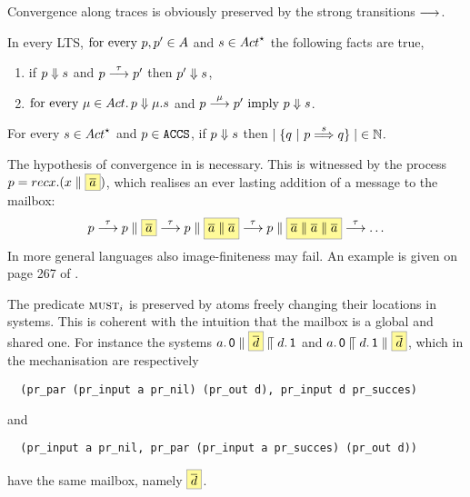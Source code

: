 Convergence along traces is obviously preserved by the strong transitions $\mathrel{\overset{}\longrightarrow}$.

\begin{lemma}%
  \label{lem:acnv-aux}
  In every LTS,
  $\text{for every } p, p' \in A$ and $ \trace \in \Actfin$
  the following facts are true,
  \begin{enumerate}
    \item
       if $p \mathrel{\Downarrow} s$
      and $p \mathrel{\overset{\tau}\longrightarrow} p'$ then $p' \mathrel{\Downarrow} s$,\label{pt:acnv-one-step-tau}
    \item
      $\forevery \mu \in \Act \wehavethat \state \cnvalong
      \mu.\trace$ and $ p \mathrel{\overset{\mu}\longrightarrow} p' \text{ imply } p \mathrel{\Downarrow} s$.\label{pt:acnv-one-step-mu}
  \end{enumerate}
\end{lemma}


\begin{lemma}%
  \label{lem:cnvalong-implies-finite-branching}
  For every $\trace \in \Actfin$ and
  $p \in \texttt{ACCS}$, if $ p \mathrel{\Downarrow} s$ then
  ${\mid \{  q  \ |\ p \mathrel{\overset{ s} \Longrightarrow} q \}  \mid} \in \mathbb{N}_{}.$
\end{lemma}
The hypothesis of convergence in  is necessary.
This is witnessed by the process $p =  \rec{(x \Par \mailbox{\co{a}})}$,
which realises an ever lasting addition of a message to the mailbox:
$$
p \st{\tau}
p \Par \mailbox{\co{a}} \st{\tau}  p \Par \mailbox{\co{a} \Par \co{a}}
\st{\tau}  p \Par \mailbox{\co{a} \Par \co{a} \Par \co{a}} \st{\tau}
\ldots
$$
In more general languages also image-finiteness may fail. An example
is given on page 267 of \cite{DBLP:conf/mfcs/HennessyP80}.





The predicate $\operatorname{\textsc{must}}_i$ is preserved by atoms freely changing their locations in systems.
This is coherent with the intuition that the mailbox is a global and
shared one. For instance the systems
$ \csys{ a.\Nil \Par \mailbox{ \co{d} } }{ d.\Unit }$  and  $ \csys{  a.\Nil }{ d.\Unit
  \Par \mailbox{\co{d}} }$, which in the mechanisation are respectively
\begin{lstlisting}
  (pr_par (pr_input a pr_nil) (pr_out d), pr_input d pr_succes)
\end{lstlisting}
and
\begin{lstlisting}
  (pr_input a pr_nil, pr_par (pr_input a pr_succes) (pr_out d))
\end{lstlisting}
have the same mailbox, namely $\mailbox{ \co{d} }$.



